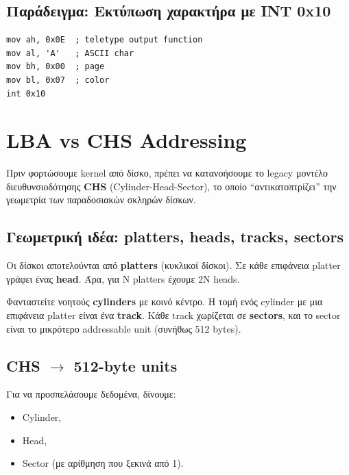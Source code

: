 \documentclass[18pt]{extarticle}
\begin{document}
\subsection{Παράδειγμα: Εκτύπωση χαρακτήρα με INT 0x10}

\begin{file}
\footnotesize \begin{lstlisting}[language={[x86masm]Assembler}, tabsize=2]
mov ah, 0x0E  ; teletype output function
mov al, 'A'   ; ASCII char
mov bh, 0x00  ; page
mov bl, 0x07  ; color
int 0x10
\end{lstlisting}
\end{file}


\section{LBA vs CHS Addressing}

Πριν φορτώσουμε kernel από δίσκο, πρέπει να κατανοήσουμε το legacy μοντέλο διευθυνσιοδότησης \textbf{CHS}
(Cylinder-Head-Sector), το οποίο “αντικατοπτρίζει” την γεωμετρία των παραδοσιακών σκληρών δίσκων.

\subsection{Γεωμετρική ιδέα: platters, heads, tracks, sectors}

Οι δίσκοι αποτελούνται από \textbf{platters} (κυκλικοί δίσκοι). Σε κάθε επιφάνεια platter γράφει ένας \textbf{head}.
Άρα, για N platters έχουμε 2N heads.

Φανταστείτε νοητούς \textbf{cylinders} με κοινό κέντρο. Η τομή ενός cylinder με μια επιφάνεια platter είναι ένα \textbf{track}.
Κάθε track χωρίζεται σε \textbf{sectors}, και το sector είναι το μικρότερο addressable unit (συνήθως 512 bytes).

\subsection{CHS $\rightarrow$ 512-byte units}

Για να προσπελάσουμε δεδομένα, δίνουμε:
\begin{itemize}
    \item Cylinder,
    \item Head,
    \item Sector (με αρίθμηση που ξεκινά από 1).
\end{itemize}
\end{document}
